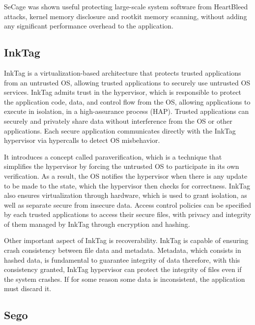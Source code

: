 SeCage was shown useful protecting large-scale system software from HeartBleed attacks, kernel memory disclosure and rootkit memory scanning, without adding any significant performance overhead to the application.


\subsection{InkTag}
\label{ssec:inktag}

InkTag \cite{inkTagPaper} is a virtualization-based architecture that protects trusted applications from an untrusted OS, allowing trusted applications to securely use untrusted OS services. InkTag admits trust in the hypervisor, which is responsible to protect the application code, data, and control flow from the OS, allowing applications to execute in isolation, in a high-assurance process (HAP). 
Trusted applications can securely and privately share data without interference from the OS or other applications. Each secure application communicates directly with the InkTag hypervisor via hypercalls to detect OS misbehavior.

It introduces a concept called paraverification, which is a technique that simplifies the hypervisor by forcing the untrusted OS to participate in its own verification. As a result, the OS notifies the hypervisor when there is any update to be made to the state, which the hypervisor then checks for correctness.
InkTag also ensures virtualization through hardware, which is used to grant isolation, as well as separate secure from insecure data.
Access control policies can be specified by each trusted applications to access their secure files, with privacy and integrity of them managed by InkTag through encryption and hashing. 
 
Other important aspect of InkTag is recoverability. InkTag is capable of ensuring crash consistency between file data and metadata. Metadata, which consists in hashed data, is fundamental to guarantee integrity of data therefore, with this consistency granted, InkTag hypervisor can protect the integrity of files even if the system crashes. If for some reason some data is inconsistent, the application must discard it.





\subsection{Sego}
\label{ssec:sego}

